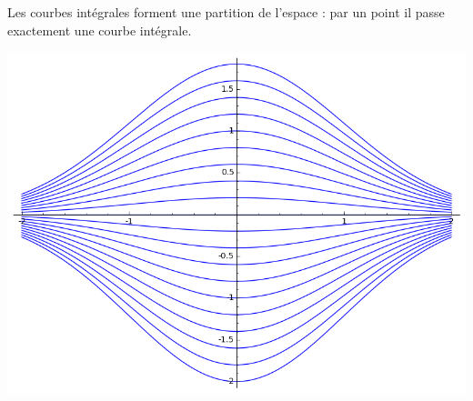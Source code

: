 \begin{frame}


Les courbes intégrales forment une partition 
de l'espace : par un point il passe exactement une courbe intégrale.

\begin{center}
\includegraphics[scale=0.45]{figures/equadiff-courbe2.png}
\end{center}

\end{frame}




